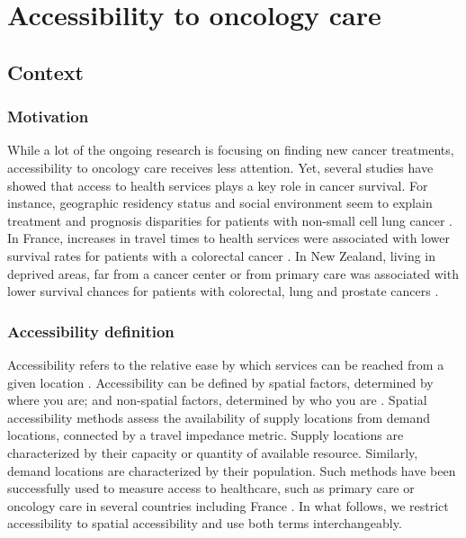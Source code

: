 \chapter{Accessibility to oncology care}

\section{Context}

\subsection{Motivation}

While a lot of the ongoing research is focusing on finding new cancer treatments, accessibility to oncology care receives less attention. Yet, several studies have showed that access to health services plays a key role in cancer survival. For instance, geographic residency status and social environment seem to explain treatment and prognosis disparities for patients with non-small cell lung cancer \cite{johnson_treatment_2014}. In France, increases in travel times to health services were associated with lower survival rates for patients with a colorectal cancer \cite{dejardin_influence_2014}. In New Zealand, living in deprived areas, far from a cancer center or from primary care was associated with lower survival chances for patients with colorectal, lung and prostate cancers \cite{haynes_cancer_2008}.

\subsection{Accessibility definition}

Accessibility refers to the relative ease by which services can be reached from a given location \cite{wang_measurement_2012}. Accessibility can be defined by spatial factors, determined by where you are; and non-spatial factors, determined by who you are \cite{khan_integrated_1992}. Spatial accessibility methods assess the availability of supply locations from demand locations, connected by a travel impedance metric. Supply locations are characterized by their capacity or quantity of available resource. Similarly, demand locations are characterized by their population. Such methods have been successfully used to measure access to healthcare, such as primary care \cite{guagliardo_spatial_2004} or oncology care \cite{wang_measurement_2012,zahnd_spatial_2021,alahmadi_spatial_2013} in several countries including France \cite{launay_methodology_2019,gusmano_disparities_2014,gao_assessment_2016}. In what follows, we restrict accessibility to spatial accessibility and use both terms interchangeably.

